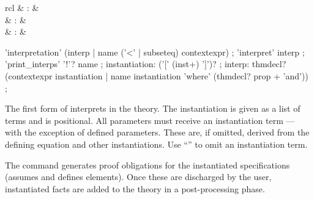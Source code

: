 \begin{isabellebody}
\begin{isamarkuptext}
  \begin{matharray}{rcl}
    \hypertarget{command.interpretation}{\hyperlink{command.interpretation}{\mbox{}}} & : &  \\
    \hypertarget{command.interpret}{\hyperlink{command.interpret}{\mbox{}}} & : &  \\
    \hypertarget{command.print_interps}{\hyperlink{command.print_interps}{\mbox{}}}\isa{{\isachardoublequote}\isactrlsup {\isacharasterisk}{\isachardoublequote}} & : &   \\
  \end{matharray}

  \begin{rail}
    'interpretation' (interp | name ('<' | subseteq) contextexpr)
    ;
    'interpret' interp
    ;
    'print\_interps' '!'? name
    ;
    instantiation: ('[' (inst+) ']')?
    ;
    interp: thmdecl? \\ (contextexpr instantiation |
      name instantiation 'where' (thmdecl? prop + 'and'))
    ;
  \end{rail}

  \begin{descr}

  \item [\hyperlink{command.interpretation}{\mbox{\isa{\isacommand{interpretation}}}}~\isa{{\isachardoublequote}expr\ insts\ {\isasymWHERE}\ eqns{\isachardoublequote}}]

  The first form of \hyperlink{command.interpretation}{\mbox{}} interprets  in the theory.  The instantiation is given as a list of terms
   and is positional.  All parameters must receive an
  instantiation term --- with the exception of defined parameters.
  These are, if omitted, derived from the defining equation and other
  instantiations.  Use ``\isa{{\isacharunderscore}}'' to omit an instantiation term.

  The command generates proof obligations for the instantiated
  specifications (assumes and defines elements).  Once these are
  discharged by the user, instantiated facts are added to the theory
  in a post-processing phase.


\end{descr}
\end{isamarkuptext}
\end{isabellebody}
